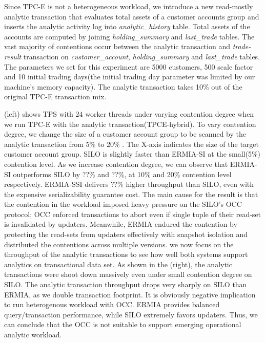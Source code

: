 Since TPC-E is not a heterogeneous workload, we introduce a new read-mostly analytic transaction that evaluates total assets of a customer accounts group and inserts the analytic activity log into \textit{analytic\_history} table. Total assets of the accounts are computed by joining \textit{holding\_summary} and \textit{last\_trade} tables. The vast majority of contentions occur between the analytic transaction and \textit{trade-result} transaction on \textit{customer\_account}, \textit{holding\_summary} and \textit{last\_trade} tables. 
The parameters we set for this experiment are 5000 customers, 500 scale factor and 10 initial trading days(the initial trading day parameter was limited by our machine's memory capacity). %
The analytic transaction takes 10\% out of the original TPC-E transaction mix. %


(left) shows TPS with 24 worker threads under varying contention degree when we run TPC-E with the analytic transaction(TPCE-hybrid). To vary contention degree, we change the size of a customer account group to be scanned by the analytic transaction from 5\% to 20\% . The X-axis indicates the size of the target customer account group. SILO is slightly faster than ERMIA-SI at the small(5\%) contention level. As we increase contention degree, we can observe that ERMIA-SI outperforms SILO by ??\% and ??\%, at 10\% and 20\% contention level respectively. ERMIA-SSI delivers ??\% higher throughput than SILO, even with the expensive serializability guarantee cost. 
The main cause for the result is that the contention in the workload imposed heavy pressure on the SILO's OCC protocol; OCC enforced transactions to abort even if single tuple of their read-set is invalidated by updaters. Meanwhile, ERMIA endured the contention by protecting the read-sets from updaters effectively with snapshot isolation and distributed the contentions across multiple versions. 
we now focus on the throughput of the analytic transactions to see how well both systems support analytics on transactional data set. As shown in the (right), the analytic transactions were shoot down massively even under small contention degree on SILO. The analytic transaction throughput drops very sharply on SILO than ERMIA, as we double transaction footprint. It is obviously negative implication to run heterogenous workload with OCC. ERMIA provides balanced query/transaction performance, while SILO extremely favors updaters. Thus, we can conclude that the OCC is not suitable to support emerging operational analytic workload. 

